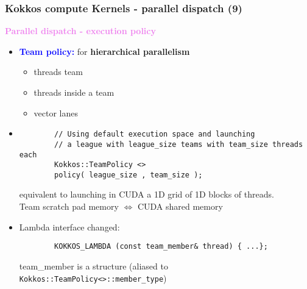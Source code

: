 \begin{frame}[fragile=singleslide]
  \frametitle{Kokkos compute Kernels - parallel dispatch (9)}
  
  {\Large \textcolor{violet}{\textbf{Parallel dispatch - execution policy}}}

  \begin{itemize}
  \item \textcolor{blue}{\bf Team policy:} for {\bf hierarchical parallelism}
    \begin{itemize}
    \item threads team %
    \item threads inside a team %
    \item vector lanes
    \end{itemize}
  \item 
    {\small
      \begin{verbatim}
        // Using default execution space and launching
        // a league with league_size teams with team_size threads each
        Kokkos::TeamPolicy <>
        policy( league_size , team_size );
      \end{verbatim}
    }
    equivalent to launching in CUDA a 1D grid of 1D blocks of threads.\\
    Team scratch pad memory $\Longleftrightarrow$ CUDA shared memory
  \item Lambda interface changed:
    {\small
      \begin{verbatim}
        KOKKOS_LAMBDA (const team_member& thread) { ...};
      \end{verbatim}
    }
    team\_member is a structure (aliased to \texttt{Kokkos::TeamPolicy<>::member\_type})
  \end{itemize}
\end{frame}
  
